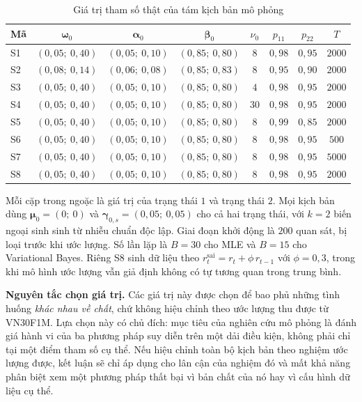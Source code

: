 \documentclass[12pt,a4paper]{article}
\numberwithin{equation}{section}
\newcommand{\bm}[1]{\symbf{#1}}
\begin{document}
\begin{table}[H]
\centering
\small
\caption{Giá trị tham số thật của tám kịch bản mô phỏng}
\label{tab:simulation-gia-tri}
\begin{threeparttable}
\begin{tabularx}{\textwidth}{p{} *{7}{C}}
\toprule
\textbf{Mã} & $\bm\omega_0$ & $\bm\alpha_0$ & $\bm\beta_0$ & $\nu_0$ & $p_{11}$ & $p_{22}$ & $T$ \\
\midrule
S1 & $(0{,}05;\ 0{,}40)$ & $(0{,}05;\ 0{,}10)$ & $(0{,}85;\ 0{,}80)$ & $8$ & $0{,}98$ & $0{,}95$ & $2000$ \\
S2 & $(0{,}08;\ 0{,}14)$ & $(0{,}06;\ 0{,}08)$ & $(0{,}85;\ 0{,}83)$ & $8$ & $0{,}95$ & $0{,}90$ & $2000$ \\
S3 & $(0{,}05;\ 0{,}40)$ & $(0{,}05;\ 0{,}10)$ & $(0{,}85;\ 0{,}80)$ & $4$ & $0{,}98$ & $0{,}95$ & $2000$ \\
S4 & $(0{,}05;\ 0{,}40)$ & $(0{,}05;\ 0{,}10)$ & $(0{,}85;\ 0{,}80)$ & $30$ & $0{,}98$ & $0{,}95$ & $2000$ \\
S5 & $(0{,}05;\ 0{,}40)$ & $(0{,}05;\ 0{,}10)$ & $(0{,}85;\ 0{,}80)$ & $8$ & $0{,}99$ & $0{,}85$ & $2000$ \\
S6 & $(0{,}05;\ 0{,}40)$ & $(0{,}05;\ 0{,}10)$ & $(0{,}85;\ 0{,}80)$ & $8$ & $0{,}98$ & $0{,}95$ & $500$ \\
S7 & $(0{,}05;\ 0{,}40)$ & $(0{,}05;\ 0{,}10)$ & $(0{,}85;\ 0{,}80)$ & $8$ & $0{,}98$ & $0{,}95$ & $5000$ \\
S8 & $(0{,}05;\ 0{,}40)$ & $(0{,}05;\ 0{,}10)$ & $(0{,}85;\ 0{,}80)$ & $8$ & $0{,}98$ & $0{,}95$ & $2000$ \\
\bottomrule
\end{tabularx}
\begin{tablenotes}
\small
\item Mỗi cặp trong ngoặc là giá trị của trạng thái $1$ và trạng thái $2$. Mọi kịch bản dùng $\bm\mu_0=(0;\ 0)$ và $\bm\gamma_{0,s}=(0{,}05;\ 0{,}05)$ cho cả hai trạng thái, với $k=2$ biến ngoại sinh sinh từ nhiễu chuẩn độc lập. Giai đoạn khởi động là $200$ quan sát, bị loại trước khi ước lượng. Số lần lặp là $B=30$ cho MLE và $B=15$ cho Variational Bayes. Riêng S8 sinh dữ liệu theo $r_t^{\text{sai}} = r_t + \phi\, r_{t-1}$ với $\phi = 0{,}3$, trong khi mô hình ước lượng vẫn giả định không có tự tương quan trong trung bình.
\end{tablenotes}
\end{threeparttable}
\end{table}

\textbf{Nguyên tắc chọn giá trị.} Các giá trị này được chọn để bao phủ những tình huống \emph{khác nhau về chất}, chứ không hiệu chỉnh theo ước lượng thu được từ VN30F1M. Lựa chọn này có chủ đích: mục tiêu của nghiên cứu mô phỏng là đánh giá hành vi của ba phương pháp suy diễn trên một dải điều kiện, không phải chỉ tại một điểm tham số cụ thể. Nếu hiệu chỉnh toàn bộ kịch bản theo nghiệm ước lượng được, kết luận sẽ chỉ áp dụng cho lân cận của nghiệm đó và mất khả năng phân biệt xem một phương pháp thất bại vì bản chất của nó hay vì cấu hình dữ liệu cụ thể.
\end{document}
